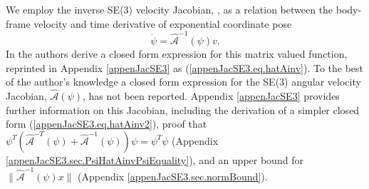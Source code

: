 

We employ the inverse SE(3) velocity Jacobian,
, as a
relation between the body-frame velocity and time derivative of
exponential coordinate pose
%
\begin{equation}\label{chModels.eq.hatAInv}
\dot{\psi}=\hat{\mathcal{A}}^{-1}(\psi) v.
\end{equation}
%
In \cite{bullo1995_SE3_PD} the authors derive a closed form expression
for this matrix valued function, reprinted in Appendix
\ref{appenJacSE3} as (\ref{appenJacSE3.eq.hatAinv}).
%
To the best of the author's knowledge a closed form expression for the
SE(3) angular velocity Jacobian, $\hat{\mathcal{A}}\left(\psi\right)$,
has not been reported.
%
Appendix \ref{appenJacSE3} provides further information on this
Jacobian, including the derivation of a simpler closed form
(\ref{appenJacSE3.eq.hatAinv2}), proof that
$\psi^T\left(\hat{\mathcal{A}}^{-T}(\psi)+\hat{\mathcal{A}}^{-1}(\psi)\right)\psi=\psi^T\psi$
(Appendix \ref{appenJacSE3.sec.PsiHatAinvPsiEquality}), and an
upper bound for $\|\hat{\mathcal{A}}^{-1}(\psi)x\|$ (Appendix
\ref{appenJacSE3.sec.normBound}).






